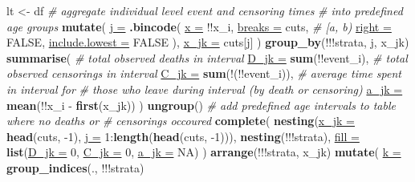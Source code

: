 \documentclass[10pt,twoside,reqno]{article}
\newenvironment{Shaded}{}{}
\newcommand{\CommentTok}[1]{\textit{#1}}
\newcommand{\DataTypeTok}[1]{\underline{#1}}
\newcommand{\DecValTok}[1]{#1}
\newcommand{\KeywordTok}[1]{\textbf{#1}}
\newcommand{\NormalTok}[1]{#1}
\newcommand{\OperatorTok}[1]{#1}
\newcommand{\OtherTok}[1]{#1}
\newcommand{\StringTok}[1]{#1}
\begin{document}
\begin{Shaded}
\begin{Highlighting}[]
  \NormalTok{  lt <-}
  \StringTok{    }\NormalTok{df }\OperatorTok{%
  \StringTok{    }\CommentTok{# aggregate individual level event and censoring times}
  \StringTok{    }\CommentTok{# into predefined age groups}
  \StringTok{    }\KeywordTok{mutate}\NormalTok{(}
        \DataTypeTok{j =}
          \KeywordTok{.bincode}\NormalTok{(}
            \DataTypeTok{x =} \OperatorTok{!!}\NormalTok{x_i, }\DataTypeTok{breaks =}\NormalTok{ cuts,}
            \CommentTok{# [a, b)}
            \DataTypeTok{right =} \OtherTok{FALSE}\NormalTok{, }\DataTypeTok{include.lowest =} \OtherTok{FALSE}
  \NormalTok{        ),}
        \DataTypeTok{x_jk =}
  \NormalTok{        cuts[j]}
  \NormalTok{    ) }\OperatorTok{%
  \StringTok{    }\KeywordTok{group_by}\NormalTok{(}\OperatorTok{!!!}\NormalTok{strata, j, x_jk) }\OperatorTok{%
  \StringTok{    }\KeywordTok{summarise}\NormalTok{(}
        \CommentTok{# total observed deaths in interval}
        \DataTypeTok{D_jk =} \KeywordTok{sum}\NormalTok{(}\OperatorTok{!!}\NormalTok{event_i),}
        \CommentTok{# total observed censorings in interval}
        \DataTypeTok{C_jk =} \KeywordTok{sum}\NormalTok{(}\OperatorTok{!}\NormalTok{(}\OperatorTok{!!}\NormalTok{event_i)),}
        \CommentTok{# average time spent in interval for}
        \CommentTok{# those who leave during interval (by death or censoring)}
        \DataTypeTok{a_jk =} \KeywordTok{mean}\NormalTok{(}\OperatorTok{!!}\NormalTok{x_i }\OperatorTok{-}\StringTok{ }\KeywordTok{first}\NormalTok{(x_jk))}
  \NormalTok{    ) }\OperatorTok{%
  \StringTok{    }\KeywordTok{ungroup}\NormalTok{() }\OperatorTok{%
  \StringTok{    }\CommentTok{# add predefined age intervals to table where no deaths or}
  \StringTok{    }\CommentTok{# censorings occoured}
  \StringTok{    }\KeywordTok{complete}\NormalTok{(}
        \KeywordTok{nesting}\NormalTok{(}\DataTypeTok{x_jk =} \KeywordTok{head}\NormalTok{(cuts, }\DecValTok{-1}\NormalTok{), }\DataTypeTok{j =} \DecValTok{1}\OperatorTok{:}\KeywordTok{length}\NormalTok{(}\KeywordTok{head}\NormalTok{(cuts, }\DecValTok{-1}\NormalTok{))),}
        \KeywordTok{nesting}\NormalTok{(}\OperatorTok{!!!}\NormalTok{strata),}
        \DataTypeTok{fill =} \KeywordTok{list}\NormalTok{(}\DataTypeTok{D_jk =} \DecValTok{0}\NormalTok{, }\DataTypeTok{C_jk =} \DecValTok{0}\NormalTok{, }\DataTypeTok{a_jk =} \OtherTok{NA}\NormalTok{)}
  \NormalTok{    ) }\OperatorTok{%
  \StringTok{    }\KeywordTok{arrange}\NormalTok{(}\OperatorTok{!!!}\NormalTok{strata, x_jk) }\OperatorTok{%
  \StringTok{    }\KeywordTok{mutate}\NormalTok{(}
        \DataTypeTok{k =} \KeywordTok{group_indices}\NormalTok{(., }\OperatorTok{!!!}\NormalTok{strata)}
}}}}}}}
\end{Highlighting}
\end{Shaded}
\end{document}
